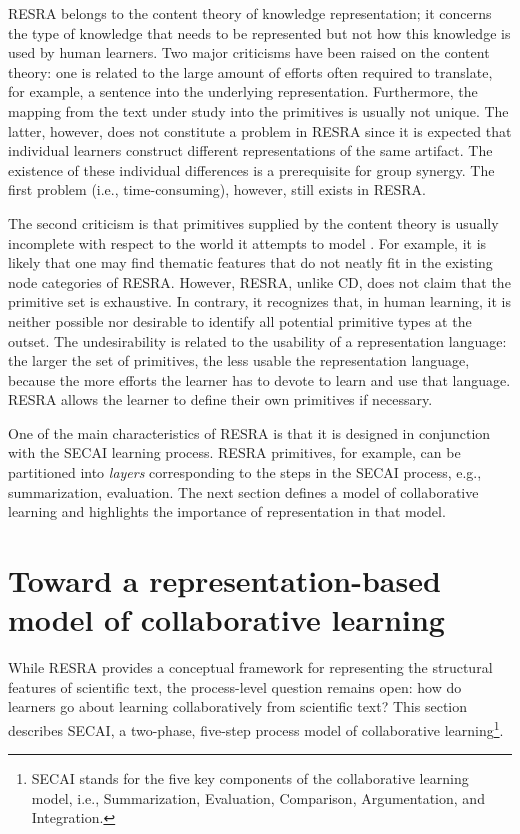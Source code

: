 RESRA belongs to the content theory of knowledge representation; it
concerns the type of knowledge that needs to be represented but not how
this knowledge is used by human learners\cite{Swaminathan90}. Two major
criticisms have been raised on the content theory: one is related to the
large amount of efforts often required to translate, for example, a
sentence into the underlying representation. Furthermore, the mapping from
the text under study into the primitives is usually not unique. The latter,
however, does not constitute a problem in RESRA since it is expected that
individual learners construct different representations of the same
artifact.  The existence of these individual differences is a prerequisite
for group synergy. The first problem (i.e., time-consuming), however, still
exists in RESRA.

The second criticism is that primitives supplied by the content theory is
usually incomplete with respect to the world it attempts to model
\cite{Swaminathan90}. For example, it is likely that one may find thematic
features that do not neatly fit in the existing node categories of RESRA.
However, RESRA, unlike CD, does not claim that the primitive set is
exhaustive. In contrary, it recognizes that, in human learning, it is
neither possible nor desirable to identify all potential primitive types at
the outset. The undesirability is related to the usability of a
representation language: the larger the set of primitives, the less usable
the representation language, because the more efforts the learner has to
devote to learn and use that language. RESRA allows the learner to define
their own primitives if necessary.

One of the main characteristics of RESRA is that it is designed in
conjunction with the SECAI learning process. RESRA primitives, for example,
can be partitioned into {\it layers\/} corresponding to the steps in the
SECAI process, e.g., summarization, evaluation. The next section defines a
model of collaborative learning and highlights the importance of
representation in that model.


\section{Toward a representation-based model of collaborative learning}
\label{sec:model}

While RESRA provides a conceptual framework for representing the structural
features of scientific text, the process-level question remains open: how
do learners go about learning collaboratively from scientific text? This
section describes SECAI, a two-phase, five-step process model of
collaborative learning\footnote{SECAI stands for the five key components of the
collaborative learning model, i.e., Summarization, Evaluation, Comparison,
Argumentation, and Integration.}.


